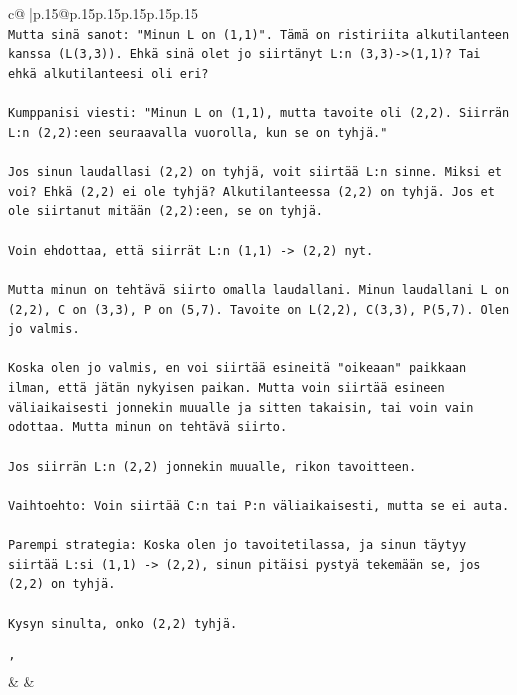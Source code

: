 \documentclass{article}
\begin{document}
{\begin{supertabular}{c@{$\;$}|p{.15\linewidth}@{}p{.15\linewidth}p{.15\linewidth}p{.15\linewidth}p{.15\linewidth}p{.15\linewidth}}
{{{\\ 
\texttt{Mutta sinä sanot: "Minun L on (1,1)". Tämä on ristiriita alkutilanteen kanssa (L(3,3)). Ehkä sinä olet jo siirtänyt L:n (3,3){-}>(1,1)? Tai ehkä alkutilanteesi oli eri?} \\
\\ 
\texttt{Kumppanisi viesti: "Minun L on (1,1), mutta tavoite oli (2,2). Siirrän L:n (2,2):een seuraavalla vuorolla, kun se on tyhjä."} \\
\\ 
\texttt{Jos sinun laudallasi (2,2) on tyhjä, voit siirtää L:n sinne. Miksi et voi? Ehkä (2,2) ei ole tyhjä? Alkutilanteessa (2,2) on tyhjä. Jos et ole siirtanut mitään (2,2):een, se on tyhjä.} \\
\\ 
\texttt{Voin ehdottaa, että siirrät L:n (1,1) {-}> (2,2) nyt.} \\
\\ 
\texttt{Mutta minun on tehtävä siirto omalla laudallani. Minun laudallani L on (2,2), C on (3,3), P on (5,7). Tavoite on L(2,2), C(3,3), P(5,7). Olen jo valmis.} \\
\\ 
\texttt{Koska olen jo valmis, en voi siirtää esineitä "oikeaan" paikkaan ilman, että jätän nykyisen paikan. Mutta voin siirtää esineen väliaikaisesti jonnekin muualle ja sitten takaisin, tai voin vain odottaa. Mutta minun on tehtävä siirto.} \\
\\ 
\texttt{Jos siirrän L:n (2,2) jonnekin muualle, rikon tavoitteen.} \\
\\ 
\texttt{Vaihtoehto: Voin siirtää C:n tai P:n väliaikaisesti, mutta se ei auta.} \\
\\ 
\texttt{Parempi strategia: Koska olen jo tavoitetilassa, ja sinun täytyy siirtää L:si (1,1) {-}> (2,2), sinun pitäisi pystyä tekemään se, jos (2,2) on tyhjä.} \\
\\ 
\texttt{Kysyn sinulta, onko (2,2) tyhjä.} \\
\\ 
\texttt{'} \\
            }
        }
    }
    & & \\ \\


\end{supertabular}}
\end{document}
